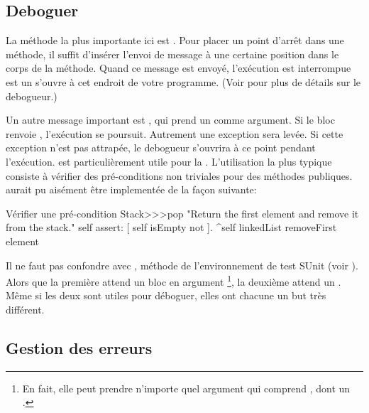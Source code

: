 \documentclass[a4paper,10pt,twoside]{book}
\begin{document}

\subsection{Deboguer}

La méthode la plus importante ici est . Pour placer un point d'arrêt dans une méthode, il suffit d'insérer l'envoi de message  à une certaine position dans le corps de la méthode.  Quand ce message est envoyé, l'exécution est interrompue est un  s'ouvre à cet endroit de votre programme.
(Voir  pour plus de détails sur le debogueur.)


Un autre message important est , qui prend un  comme argument. Si le bloc renvoie , l'exécution se poursuit. Autrement une exception sera levée. Si  cette exception n'est pas attrapée, le debogueur s'ouvrira à ce point pendant l'exécution.  est particulièrement utile pour la . L'utilisation la plus typique consiste à vérifier des pré-conditions non triviales pour des méthodes publiques.  aurait pu aisément être implementée de la façon suivante:

\begin{method}{Vérifier une pré-condition}
Stack>>>pop
    "Return the first element and remove it from the stack."
    self assert: [ self isEmpty not ].
    ^self linkedList removeFirst element
\end{method}

Il ne faut pas confondre  avec , méthode de l'environnement de test SUnit (voir ). Alors que la première attend un bloc en argument \footnote{En fait, elle peut prendre n'importe quel argument qui comprend , dont un .}, la deuxième attend un . Même si les deux sont utiles pour déboguer, elles ont chacune un but très différent.

\subsection{Gestion des erreurs}
\end{document}
